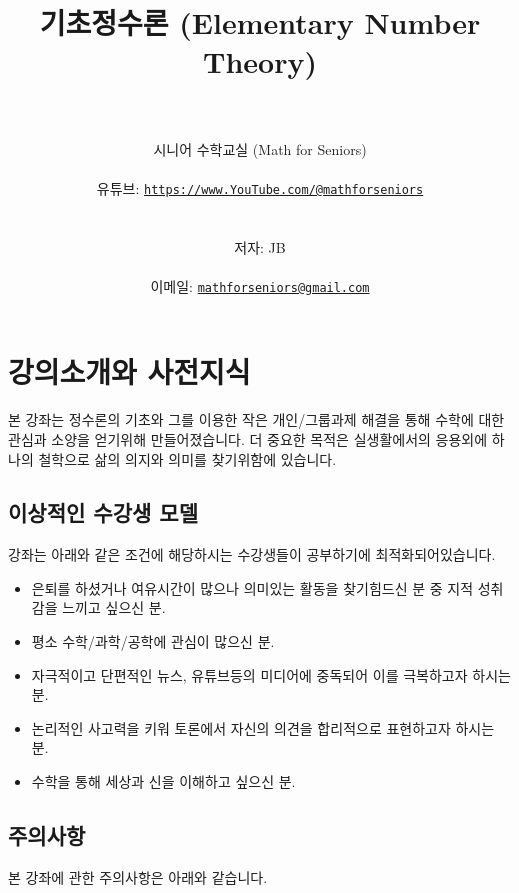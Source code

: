 \documentclass[a4paper, 11pt]{report}
\title{\textbf{기초정수론 (Elementary Number Theory)}}
\author{\instrdate\\\\[.5ex]
 시니어 수학교실 (Math for Seniors)\\\\유튜브: \href{https://www.youtube.com/@mathforseniors}{\texttt{https://www.YouTube.com/@mathforseniors}}\\\\\\
 저자: JB\\\\이메일: \href{mailto:mathforseniors@gmail.com}{\texttt{mathforseniors@gmail.com}}}
\date{}
\renewcommand{\<}{\langle}
\renewcommand{\>}{\rangle}
\begin{document}
\maketitle
{}

\begingroup
\small
\tableofcontents
\endgroup


\newpage %

\chapter{강의소개와 사전지식}

본 강좌는 정수론의 기초와 그를 이용한 작은 개인/그룹과제 해결을 통해
수학에 대한 관심과 소양을 얻기위해 만들어졌습니다. 더 중요한 목적은 
실생활에서의 응용외에 하나의 철학으로 삶의 의지와 의미를 찾기위함에 
있습니다.

\section{이상적인 수강생 모델}

강좌는 아래와 같은 조건에 해당하시는 수강생들이 공부하기에 최적화되어있습니다.

\begin{itemize}
  \item 은퇴를 하셨거나 여유시간이 많으나 의미있는 활동을 찾기힘드신 분 중
  지적 성취감을 느끼고 싶으신 분.
  \item 평소 수학/과학/공학에 관심이 많으신 분.
  \item 자극적이고 단편적인 뉴스, 유튜브등의 미디어에 중독되어 이를 극복하고자
  하시는 분.
  \item 논리적인 사고력을 키워 토론에서 자신의 의견을 합리적으로 표현하고자
  하시는 분.
  \item 수학을 통해 세상과 신을 이해하고 싶으신 분.
\end{itemize}

\section{주의사항}

본 강좌에 관한 주의사항은 아래와 같습니다.
\end{document}
